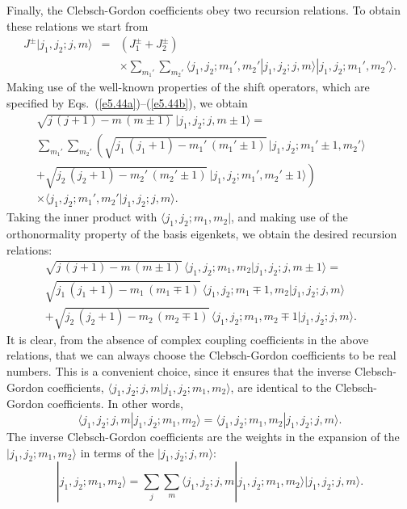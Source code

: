Finally, the Clebsch-Gordon coefficients obey two recursion relations. 
To obtain these relations we start from
\begin{eqnarray}
J^{\pm} |j_1,j_2;j,m\rangle& =& (J_1^\pm + J_2^\pm )\\[0.5ex]
&&\times\sum_{m_1'}\sum_{m_2'} \langle j_1, j_2; m_1', m_2'|j_1, j_2; j, m\rangle
|j_1, j_2; m_1', m_2'\rangle.\nonumber
\end{eqnarray}
Making use of the well-known properties of the shift operators,
which are specified  by Eqs.~(\ref{e5.44a})--(\ref{e5.44b}), we obtain
\begin{eqnarray}
\sqrt{j\,(j+1)- m\,(m\pm 1)}\, |j_1,j_2;j,m\pm 1\rangle =&&\nonumber\\[0.5ex]
\sum_{m_1'}\sum_{m_2'} \left( \sqrt{j_1\,(j_1+1)- m_1'\,(m_1'\pm 1)}\,
|j_1, j_2; m_1'\pm 1, m_2'\rangle\right.&&\nonumber\\[0.5ex]
 \left.+\sqrt{ j_2\,(j_2+1)- m_2'\,(m_2'\pm 1)}\,
|j_1, j_2; m_1', m_2'\pm 1\rangle\right) \nonumber\\[0.5ex]
 \times\langle j_1, j_2; m_1', m_2'|j_1, j_2; j, m\rangle.&&
\end{eqnarray}
Taking the inner product with $\langle j_1, j_2; m_1, m_2|$, and making
use of the orthonormality property of the basis eigenkets, we obtain 
the desired recursion relations:
\begin{eqnarray}\label{e5.223}
\sqrt{j\,(j+1)- m\,(m\pm 1)} \,\langle j_1, j_2; m_1, m_2|j_1,j_2;j, m\pm 1\rangle=
&&\nonumber \\[0.5ex]
\sqrt{j_1\,(j_1+1) - m_1\,(m_1\mp 1)} \,
\langle j_1, j_2; m_1\mp 1, m_2|j_1,j_2;j, m\rangle&&\nonumber \\[0.5ex]
+ \sqrt{j_2\,(j_2+1) - m_2\,(m_2\mp 1)} \,
\langle j_1, j_2; m_1, m_2\mp 1|j_1,j_2;j, m\rangle.
\end{eqnarray}
It is clear, from the absence of complex coupling coefficients in the above relations,
that we can always choose the Clebsch-Gordon coefficients to be real numbers.
This is a convenient choice, since it ensures that the inverse Clebsch-Gordon
coefficients, $\langle j_1, j_2; j, m|j_1, j_2; m_1, m_2\rangle$, are
identical to the Clebsch-Gordon coefficients. In other words,
\begin{equation}
\langle j_1, j_2; j, m|j_1, j_2; m_1, m_2\rangle = 
\langle j_1, j_2; m_1, m_2|j_1, j_2; j, m\rangle.
\end{equation}
The inverse Clebsch-Gordon coefficients are the weights in the expansion
of the $|j_1,j_2; m_1, m_2\rangle$ in terms of the $|j_1, j_2; j,m\rangle$:
\begin{equation}
|j_1,j_2; m_1,m_2\rangle = \sum_{j}\sum_m \langle j_1, j_2; j, m|j_1, j_2; m_1, m_2\rangle |j_1,j_2; j,m\rangle.
\end{equation}

